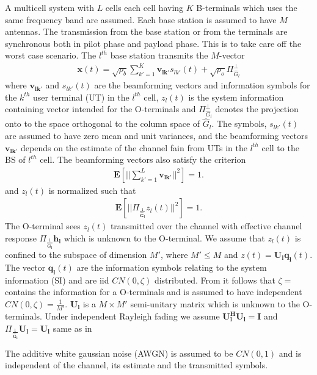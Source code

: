 \documentclass[10pt, a4paper, twoside,fleqn]{article}
\begin{document}
	A multicell system with $L$ cells each cell having $K$ B-terminals which uses the same frequency band are assumed. Each base station is assumed to have $M$ antennas. The transmission from the base station or from the terminals are synchronous both in pilot phase and payload phase. This is to take care off the worst case scenario. The $l^{th}$ base station transmits the $M$-vector
\begin{eqnarray}
	\mathbf{x}(t) = \sqrt{\rho_b}\sum\limits_{k'=1}^{K}\mathbf{v_{lk'}}s_{lk'}(t)
		      + \sqrt{\rho_o}\Pi^{\perp}_{{\widehat{G}_l}}
\end{eqnarray}
where $\mathbf{v_{lk'}}$ and $s_{lk'}(t)$ are the beamforming vectors and information symbols for the $k^{th}$ user terminal (UT) in the $l^{th}$ cell, $z_l(t)$ is the system information containing vector intended for the O-terminals and $\Pi^{\perp}_{{\widehat{G}_l}}$ denotes the projection onto to the space orthogonal to the column space of $\hat G_l$. The symbols, $s_{lk'}(t)$ are assumed to have zero mean and unit variances, and the beamforming vectors $\mathbf{v_{lk'}}$ depends on the estimate of the channel fain from UTs in the $l^{th}$ cell to the BS of $l^{th}$ cell. 
The beamforming vectors also satisfy the criterion
\begin{eqnarray}
	\mathbf{E}\left[||\sum\limits_{k'=1}^{L}\mathbf{v_{lk'}}||^2\right]=1.
\end{eqnarray}
and $z_l(t)$ is normalized such that
\begin{eqnarray}\label{eqn:zlcondition}
	\mathbf{E}\left[||\Pi_{\frac{1}{\mathbf{\hat G_l}}}z_l(t)||^2\right]=1.
\end{eqnarray}
The O-terminal sees $z_l(t)$ transmitted over the channel with effective channel response $\Pi_{\frac{1}{\mathbf{\hat G_l}}}\mathbf{h_l}$ which is unknown to the O-terminal. We assume that $z_l(t)$ is confined to the subspace of dimension $M'$, where $M'\leq M$ and $z(t) = \mathbf{U_lq_l}(t)$. The vector $\mathbf{q_l}(t)$ are the information symbols relating to the system information (SI) and are iid $CN(0,\zeta)$ distributed. From \cite{bib:jbb} it follows that $\zeta=$ contains the information for a O-terminals  and is assumed to have independent $CN(0, \zeta)=\frac{1}{M'}$. $\mathbf{U_l}$ is a $M\times M'$ semi-unitary matrix which is unknown to the O-terminals. Under independent Rayleigh fading we assume $\mathbf{U_l^HU_l=I}$ and $\Pi_{\frac{1}{\mathbf{\hat G_l}}}\mathbf{U_l=U_l}$ same as in \cite{bib:jbb}

The additive white gaussian noise (AWGN) is assumed to be $CN(0,1)$ and is independent of the channel, its estimate and the transmitted symbols.
\end{document}
